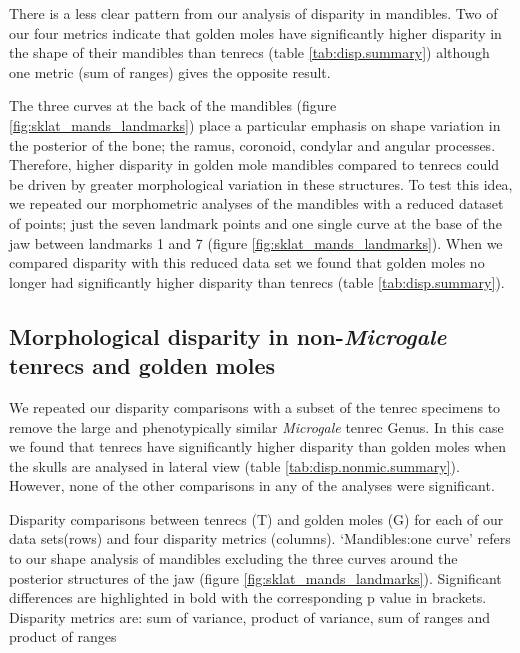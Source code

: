 \documentclass[12pt,a4paper]{article}
\begin{document}

	
	
	There is a less clear pattern from our analysis of disparity in mandibles. Two of our four metrics indicate that golden moles have significantly higher disparity in the shape of their mandibles than tenrecs (table \ref{tab:disp.summary}) although one metric (sum of ranges) gives the opposite result. 
	
	The three curves at the back of the mandibles (figure \ref{fig:sklat_mands_landmarks}) place a particular emphasis on shape variation in the posterior of the bone; the ramus, coronoid, condylar and angular processes. Therefore, higher disparity in golden mole mandibles compared to tenrecs could be driven by greater morphological variation in these structures. To test this idea, we repeated our morphometric analyses of the mandibles with a reduced dataset of points; just the seven landmark points and one single curve at the base of the jaw between landmarks 1 and 7 (figure \ref{fig:sklat_mands_landmarks}). When we compared disparity with this reduced data set we found that golden moles no longer had significantly higher disparity than tenrecs (table \ref{tab:disp.summary}).
	
\subsection{Morphological disparity in non-\textit{Microgale} tenrecs and golden moles} 	   
	We repeated our disparity comparisons with a subset of the tenrec specimens to remove the large and phenotypically similar \textit{Microgale} tenrec Genus. In this case we found that tenrecs have significantly higher disparity than golden moles when the skulls are analysed in lateral view (table \ref{tab:disp.nonmic.summary}). However, none of the other comparisons in any of the analyses were significant. 



	\begin{table}[h]			
	\caption[Summary of disparity comparisons between tenrecs and golden moles]
		{Disparity comparisons between tenrecs (T) and golden moles (G) for each of our data sets(rows) and four disparity metrics (columns). `Mandibles:one curve' refers to our shape analysis of mandibles excluding the three curves around the posterior structures of the jaw (figure \ref{fig:sklat_mands_landmarks}). Significant differences are highlighted in bold with the corresponding p value in brackets. Disparity metrics are: sum of variance, product of variance, sum of ranges and product of ranges }
	\centering
	 
	\label{tab:disp.summary}  
	\end{table}
\end{document}
